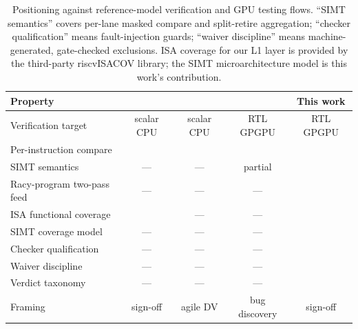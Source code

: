 \documentclass[conference]{IEEEtran}
\begin{document}
\begin{table}[t]
	\caption{Positioning against reference-model verification and GPU
		testing flows. ``SIMT semantics'' covers per-lane masked compare and
		split-retire aggregation; ``checker qualification'' means
		fault-injection guards; ``waiver discipline'' means machine-generated,
		gate-checked exclusions. ISA coverage for our L1 layer is provided by
		the third-party riscvISACOV library; the SIMT microarchitecture model
		is this work's contribution.}
	\label{tab:positioning}
	\centering
	\scriptsize
	\setlength{\tabcolsep}{2.5pt}
	\begin{tabular}{lcccc}
		\toprule
		Property                   & \cite{corevverif,imperasdv} & \cite{difftest} &
		\cite{fuzzgpu}             & This work                                                                  \\
		\midrule
		Verification target        & scalar CPU                  & scalar CPU      & RTL GPGPU     & RTL GPGPU  \\
		Per-instruction compare    & \checkmark                  & \checkmark      & \checkmark    &
		\checkmark                                                                                              \\
		SIMT semantics             & ---                         & ---             & partial       & \checkmark \\
		Racy-program two-pass feed & ---                         & ---             & ---           & \checkmark \\
		ISA functional coverage    & \checkmark                  & ---             & ---           & \checkmark \\
		SIMT coverage model        & ---                         & ---             & ---           & \checkmark \\
		Checker qualification      & ---                         & ---             & ---           & \checkmark \\
		Waiver discipline          & ---                         & ---             & ---           & \checkmark \\
		Verdict taxonomy           & ---                         & ---             & ---           & \checkmark \\
		Framing                    & sign-off                    & agile DV        & bug discovery & sign-off   \\
		\bottomrule
	\end{tabular}
\end{table}
\end{document}
